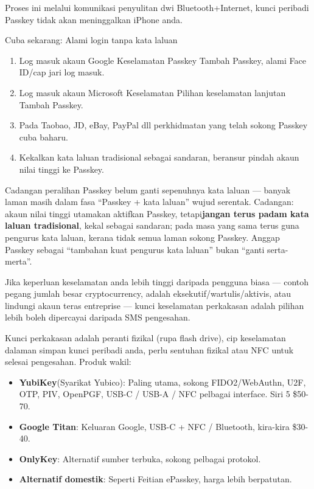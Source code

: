 Proses ini melalui komunikasi penyulitan dwi Bluetooth+Internet, kunci peribadi Passkey tidak akan meninggalkan iPhone anda.

\begin{tcbpractice}{Cuba sekarang: Alami login tanpa kata laluan}
\begin{enumerate}
  \item Log masuk akaun Google Keselamatan Passkey Tambah Passkey, alami Face ID/cap jari log masuk.
  \item Log masuk akaun Microsoft Keselamatan Pilihan keselamatan lanjutan Tambah Passkey.
  \item Pada Taobao, JD, eBay, PayPal dll perkhidmatan yang telah sokong Passkey cuba baharu.
  \item Kekalkan kata laluan tradisional sebagai sandaran, beransur pindah akaun nilai tinggi ke Passkey.
\end{enumerate}

\end{tcbpractice}

\begin{tcbwarn}{Cadangan peralihan}
Passkey belum ganti sepenuhnya kata laluan — banyak laman masih dalam fasa “Passkey + kata laluan” wujud serentak. Cadangan: akaun nilai tinggi utamakan aktifkan Passkey, tetapi\textbf{jangan terus padam kata laluan tradisional}, kekal sebagai sandaran; pada masa yang sama terus guna pengurus kata laluan, kerana tidak semua laman sokong Passkey. Anggap Passkey sebagai “tambahan kuat pengurus kata laluan” bukan “ganti serta-merta”.

\end{tcbwarn}


Jika keperluan keselamatan anda lebih tinggi daripada pengguna biasa — contoh pegang jumlah besar cryptocurrency, adalah eksekutif/wartulis/aktivis, atau lindungi akaun teras entreprise — kunci keselamatan perkakasan adalah pilihan lebih boleh dipercayai daripada SMS pengesahan.


Kunci perkakasan adalah peranti fizikal (rupa flash drive), cip keselamatan dalaman simpan kunci peribadi anda, perlu sentuhan fizikal atau NFC untuk selesai pengesahan. Produk wakil:

\begin{itemize}
  \item \textbf{YubiKey}(Syarikat Yubico): Paling utama, sokong FIDO2/WebAuthn, U2F, OTP, PIV, OpenPGF, USB-C / USB-A / NFC pelbagai interface. Siri 5 \$50-70.
  \item \textbf{Google Titan}: Keluaran Google, USB-C + NFC / Bluetooth, kira-kira \$30-40.
  \item \textbf{OnlyKey}: Alternatif sumber terbuka, sokong pelbagai protokol.
  \item \textbf{Alternatif domestik}: Seperti Feitian ePasskey, harga lebih berpatutan.
\end{itemize}

